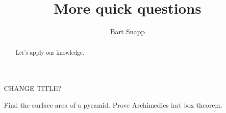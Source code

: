 \documentclass[handout,nooutcomes,noauthor]{ximera}
\title{More quick questions}
\author{Bart Snapp}
\begin{document}
\begin{abstract}
  Let's apply our knowledge.
\end{abstract}
\maketitle


\begin{listOutcomes}
\item 
\end{listOutcomes}


\mynewpage



CHANGE TITLE?

Find the surface area of a pyramid.
Prove Archimedies hat box theorem.


\begin{question}
  
\end{question}

\mynewpage


\begin{question}
  
\end{question}

\mynewpage


\begin{question}
  
\end{question}
\end{document}
